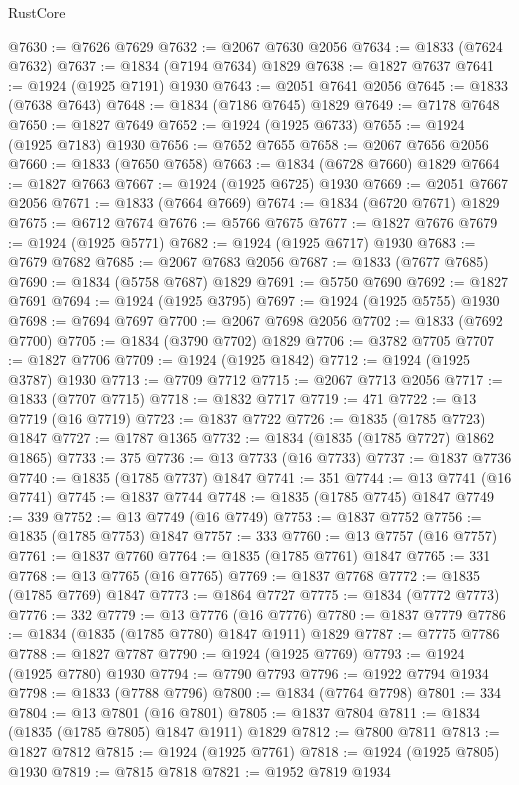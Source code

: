\begin{lexlean}{RustCore}
\begin{coremodule}
@7630 := @7626 @7629
@7632 := @2067 @7630 @2056
@7634 := @1833 (@7624 @7632)
@7637 := @1834 (@7194 @7634) @1829
@7638 := @1827 @7637
@7641 := @1924 (@1925 @7191) @1930
@7643 := @2051 @7641 @2056
@7645 := @1833 (@7638 @7643)
@7648 := @1834 (@7186 @7645) @1829
@7649 := @7178 @7648
@7650 := @1827 @7649
@7652 := @1924 (@1925 @6733)
@7655 := @1924 (@1925 @7183) @1930
@7656 := @7652 @7655
@7658 := @2067 @7656 @2056
@7660 := @1833 (@7650 @7658)
@7663 := @1834 (@6728 @7660) @1829
@7664 := @1827 @7663
@7667 := @1924 (@1925 @6725) @1930
@7669 := @2051 @7667 @2056
@7671 := @1833 (@7664 @7669)
@7674 := @1834 (@6720 @7671) @1829
@7675 := @6712 @7674
@7676 := @5766 @7675
@7677 := @1827 @7676
@7679 := @1924 (@1925 @5771)
@7682 := @1924 (@1925 @6717) @1930
@7683 := @7679 @7682
@7685 := @2067 @7683 @2056
@7687 := @1833 (@7677 @7685)
@7690 := @1834 (@5758 @7687) @1829
@7691 := @5750 @7690
@7692 := @1827 @7691
@7694 := @1924 (@1925 @3795)
@7697 := @1924 (@1925 @5755) @1930
@7698 := @7694 @7697
@7700 := @2067 @7698 @2056
@7702 := @1833 (@7692 @7700)
@7705 := @1834 (@3790 @7702) @1829
@7706 := @3782 @7705
@7707 := @1827 @7706
@7709 := @1924 (@1925 @1842)
@7712 := @1924 (@1925 @3787) @1930
@7713 := @7709 @7712
@7715 := @2067 @7713 @2056
@7717 := @1833 (@7707 @7715)
@7718 := @1832 @7717
@7719 := 471
@7722 := @13 @7719 (@16 @7719)
@7723 := @1837 @7722
@7726 := @1835 (@1785 @7723) @1847
@7727 := @1787 @1365
@7732 := @1834 (@1835 (@1785 @7727) @1862 @1865)
@7733 := 375
@7736 := @13 @7733 (@16 @7733)
@7737 := @1837 @7736
@7740 := @1835 (@1785 @7737) @1847
@7741 := 351
@7744 := @13 @7741 (@16 @7741)
@7745 := @1837 @7744
@7748 := @1835 (@1785 @7745) @1847
@7749 := 339
@7752 := @13 @7749 (@16 @7749)
@7753 := @1837 @7752
@7756 := @1835 (@1785 @7753) @1847
@7757 := 333
@7760 := @13 @7757 (@16 @7757)
@7761 := @1837 @7760
@7764 := @1835 (@1785 @7761) @1847
@7765 := 331
@7768 := @13 @7765 (@16 @7765)
@7769 := @1837 @7768
@7772 := @1835 (@1785 @7769) @1847
@7773 := @1864 @7727
@7775 := @1834 (@7772 @7773)
@7776 := 332
@7779 := @13 @7776 (@16 @7776)
@7780 := @1837 @7779
@7786 := @1834 (@1835 (@1785 @7780) @1847 @1911) @1829
@7787 := @7775 @7786
@7788 := @1827 @7787
@7790 := @1924 (@1925 @7769)
@7793 := @1924 (@1925 @7780) @1930
@7794 := @7790 @7793
@7796 := @1922 @7794 @1934
@7798 := @1833 (@7788 @7796)
@7800 := @1834 (@7764 @7798)
@7801 := 334
@7804 := @13 @7801 (@16 @7801)
@7805 := @1837 @7804
@7811 := @1834 (@1835 (@1785 @7805) @1847 @1911) @1829
@7812 := @7800 @7811
@7813 := @1827 @7812
@7815 := @1924 (@1925 @7761)
@7818 := @1924 (@1925 @7805) @1930
@7819 := @7815 @7818
@7821 := @1952 @7819 @1934

\end{coremodule}
\end{lexlean}
